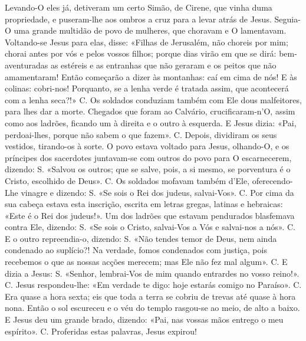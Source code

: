 \begin{paracol}{2}
{Levando-O eles já, detiveram um certo Simão, de Cirene, que vinha duma propriedade, e puseram-lhe aos ombros a cruz para a levar atrás de Jesus. Seguia-O uma grande multidão de povo de mulheres, que choravam e O lamentavam. Voltando-se Jesus para elas, disse: \cruz «Filhas de Jerusalém, não choreis por mim; chorai antes por vós e pelos vossos filhos; porque dias virão em que se dirá: bem-aventuradas as estéreis e as entranhas que não geraram e os peitos que não amamentaram! Então começarão a dizer às montanhas: caí em cima de nós! E às colinas: cobri-nos! Porquanto, se a lenha verde é tratada assim, que acontecerá com a lenha seca?!» {\redx C.} Os soldados conduziam também com Ele dous malfeitores, para lhes dar a morte. Chegados que foram ao Calvário, crucificaram-n’O, assim como aos ladrões, ficando um à direita e o outro à esquerda. E Jesus dizia: \cruz «Pai, perdoai-lhes, porque não sabem o que fazem». {\redx C.} Depois, dividiram os seus vestidos, tirando-os à sorte. O povo estava voltado para Jesus, olhando-O, e os príncipes dos sacerdotes juntavam-se com outros do povo para O escarnecerem, dizendo: {\redx S.} «Salvou os outros; que se salve, pois, a si mesmo, se porventura é o Cristo, escolhido de Deus». {\redx C.} Os soldados mofavam também d’Ele, oferecendo-Lhe vinagre e dizendo: {\redx S.} «Se sois o Rei dos judeus, salvai-Vos». {\redx C.} Por cima da sua cabeça estava esta inscrição, escrita em letras gregas, latinas e hebraicas: «Este é o Rei dos judeus!». Um dos ladrões que estavam pendurados blasfemava contra Ele, dizendo: {\redx S.} «Se sois o Cristo, salvai-Vos a Vós e salvai-nos a nós». {\redx C.} E o outro repreendia-o, dizendo: {\redx S.} «Não tendes temor de Deus, nem ainda condenado ao suplício?! Na verdade, fomos condenados com justiça, pois recebemos o que as nossas acções merecem; mas Ele não fez mal algum». {\redx C.} E dizia a Jesus: {\redx S.} «Senhor, lembrai-Vos de mim quando entrardes no vosso reino!». {\redx C.} Jesus respondeu-lhe: \cruz «Em verdade te digo: hoje estarás comigo no Paraíso». {\redx C.} Era quase a hora sexta; eis que toda a terra se cobriu de trevas até quase à hora nona. Então o sol escureceu e o véu do templo rasgou-se ao meio, de alto a baixo. E Jesus deu um grande brado, dizendo: \cruz «Pai, nas vossas mãos entrego o meu espírito». {\redx C.} Proferidas estas palavras, Jesus expirou!
}\switchcolumn*{}\switchcolumn{}\switchcolumn*{}
\end{paracol}
